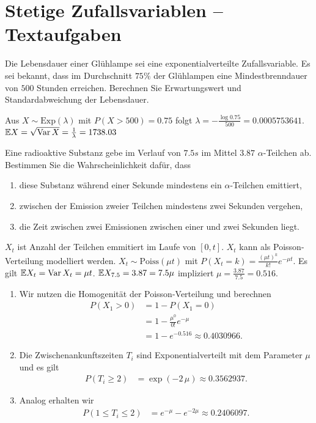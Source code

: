 \section{Stetige Zufallsvariablen -- Textaufgaben}

 Die Lebensdauer einer Glühlampe sei
eine exponentialverteilte Zufallsvariable.  Es sei bekannt, dass im Durchschnitt
$75\%$ der Glühlampen eine Mindestbrenndauer von $500$ Stunden erreichen.
Berechnen Sie Erwartungswert und Standardabweichung der Lebensdauer. 

\solution Aus $X \sim \text{Exp}(\lambda)$ mit $P(X>500) = 0.75$
folgt $\lambda = - \frac{\log 0.75}{ 500} = 0.0005753641$.  $\mathbb E X = \sqrt{
\operatorname{Var} X } = \frac{1}{\lambda} = 1738.03$


 Eine radioaktive Substanz gebe im Verlauf
von $7.5 s$ im Mittel $3.87$ $\alpha$-Teilchen ab. Bestimmen Sie die
Wahrscheinlichkeit dafür, dass
\begin{enumerate}
    \item diese Substanz während einer Sekunde mindestens ein
        $\alpha$-Teilchen emittiert,
    \item zwischen der Emission zweier Teilchen mindestens zwei
        Sekunden vergehen,
    \item die Zeit zwischen zwei Emissionen zwischen einer und
        zwei Sekunden liegt.
\end{enumerate}

\solution $X_t$ ist Anzahl der Teilchen emmitiert im Laufe von
$[0,t]$. $X_t$ kann als Poisson-Verteilung modelliert werden. $X_t \sim \text{Poiss}(\mu t)$ mit $P(X_t = k) = \frac{ (\mu t)^{k} }{k!} e^{- \mu
t}$. Es gilt $\mathbb E X_t = \operatorname{Var} X_t = \mu t$. $\mathbb E X_{7.5} = 3.87 = 7.5 \mu$
impliziert $\mu = \frac{3.87}{7.5} = 0.516$.
\begin{enumerate}
    \item Wir nutzen die Homogenität der Poisson-Verteilung und berechnen
        \begin{align*}
            P(X_1 > 0) &= 1 - P(X_1=0) \\
            &= 1 - \frac{\mu^0}{0!}e^{-\mu} \\ 
            &= 1-e^{-0.516} \approx 0.4030966.
        \end{align*}
    \item Die Zwischenankunftszeiten $T_i$ sind Exponentialverteilt mit dem Parameter $\mu$
        und es gilt
        \begin{align*}
            P(T_i \geq 2) &= \exp( -2 \,\mu ) \approx 0.3562937.
        \end{align*}
    \item Analog erhalten wir
        \begin{align*}
            P( 1 \leq T_i \leq 2) &= e^{-\mu}-e^{-2\mu} \approx 0.2406097.
        \end{align*}
\end{enumerate}


